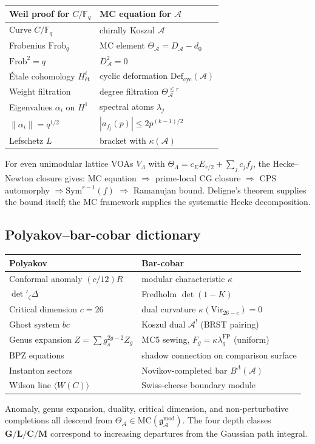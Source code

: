 \documentclass[11pt,reqno]{amsart}
\theoremstyle{definition}
\theoremstyle{remark}
\providecommand{\cA}{\mathcal{A}}
\providecommand{\Defcyc}{\mathrm{Def}_{\mathrm{cyc}}}
\providecommand{\MC}{\mathrm{MC}}
\providecommand{\Sym}{\mathrm{Sym}}
\providecommand{\gAmod}{\mathfrak{g}^{\mathrm{mod}}_\cA}
\providecommand{\Vir}{\mathrm{Vir}}
\providecommand{\FP}{\mathrm{FP}}
\providecommand{\Defcyc}{\mathrm{Def}_{\mathrm{cyc}}}
\providecommand{\FP}{\mathrm{FP}}
\providecommand{\bF}{\mathbb{F}}
\numberwithin{equation}{section}
\begin{document}
\begin{center}
\small
\renewcommand{\arraystretch}{1.1}
\begin{tabular}{ll}
\textbf{Weil proof for $C/\bF_q$} & \textbf{MC equation for $\cA$}\\ \hline
Curve $C/\bF_q$ & chirally Koszul $\cA$\\
Frobenius $\mathrm{Frob}_q$ & MC element $\Theta_\cA = D_\cA - d_0$\\
$\mathrm{Frob}^2 = q$ & $D_\cA^2 = 0$\\
\'Etale cohomology $H^i_{\text{\'et}}$ & cyclic deformation $\Defcyc(\cA)$\\
Weight filtration & degree filtration $\Theta_\cA^{\le r}$\\
Eigenvalues $\alpha_i$ on $H^1$ & spectral atoms $\lambda_j$\\
$\|\alpha_i\| = q^{1/2}$ & $|a_{f_j}(p)| \le 2p^{(k-1)/2}$\\
Lefschetz $L$ & bracket with $\kappa(\cA)$
\end{tabular}
\end{center}
For even unimodular lattice VOAs $V_\Lambda$ with
$\Theta_\Lambda = c_E E_{r/2} + \sum_j c_j f_j$, the
Hecke--Newton closure gives: MC equation $\Rightarrow$
prime-local CG closure $\Rightarrow$ CPS automorphy
$\Rightarrow \Sym^{r-1}(f)$ $\Rightarrow$ Ramanujan bound.
Deligne's theorem supplies the bound itself; the MC framework
supplies the systematic Hecke decomposition.

\subsection*{Polyakov--bar-cobar dictionary}

\begin{center}
\small
\renewcommand{\arraystretch}{1.1}
\begin{tabular}{ll}
\textbf{Polyakov} & \textbf{Bar-cobar}\\ \hline
Conformal anomaly $(c/12)R$ & modular characteristic $\kappa$\\
$\det'_\zeta \Delta$ & Fredholm $\det(1 - K)$\\
Critical dimension $c = 26$ & dual curvature $\kappa(\Vir_{26-c}) = 0$\\
Ghost system $bc$ & Koszul dual $\cA^!$ (BRST pairing)\\
Genus expansion $Z = \sum g_s^{2g-2}Z_g$
 & MC5 sewing, $F_g = \kappa\lambda_g^{\FP}$ (uniform)\\
BPZ equations & shadow connection on comparison surface\\
Instanton sectors & Novikov-completed bar $B^\Lambda(\cA)$\\
Wilson line $\langle W(C)\rangle$ & Swiss-cheese boundary module
\end{tabular}
\end{center}
Anomaly, genus expansion, duality, critical dimension, and
non-perturbative completions all descend from
$\Theta_\cA \in \MC(\gAmod)$. The four depth classes
$\mathbf G/\mathbf L/\mathbf C/\mathbf M$ correspond to
increasing departures from the Gaussian path integral.
\end{document}
